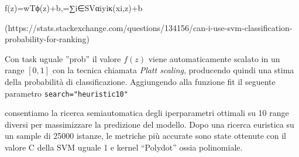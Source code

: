 f(z)=wTϕ(z)+b,=∑i∈SVαiyiκ(xi,z)+b 

(https://stats.stackexchange.com/questions/134156/can-i-use-svm-classification-probability-for-ranking)


Con task uguale ”prob” il valore $f(z)$ viene automaticamente scalato in un range $[0, 1]$ con la tecnica chiamata \textit{Platt scaling}, producendo quindi una stima della probabilità di classificazione.
Aggiungendo alla funzione fit il seguente parametro \texttt{search="heuristic10"}

consentiamo la ricerca semiautomatica degli iperparametri ottimali su 10 range diversi per massimizzare la predizione del modello.
Dopo una ricerca euristica su un sample di 25000 istanze, le metriche più accurate sono state ottenute con il valore C della SVM uguale 1 e kernel “Polydot” ossia polinomiale.
